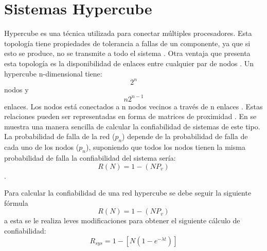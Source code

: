 \section{Sistemas Hypercube}\label{sec:hypercube}
Hypercube es una técnica utilizada para
conectar múltiples procesadores. Esta topología
tiene propiedades de tolerancia a fallas de un
componente, ya que si esto se produce, no se
transmite a todo el sistema \citep{Rong96}. Otra ventaja que
presenta esta topología es la disponibilidad de
enlaces entre cualquier par de nodos \citep{Mostafa14}. Un
hypercube n-dimensional tiene: $$2^n $$ nodos y $$n2^{n-1}$$ enlaces.
Los nodos está conectados a n nodos vecinos a través de n enlaces \citep{Rong96}. Estas
relaciones pueden ser representadas en forma de matrices de proximidad \citep{Mostafa14}.
En \cite{Mostafa14} se muestra una manera sencilla de calcular la confiabilidad
de sistemas de este tipo. La probabilidad de falla de la red ($p_n$) depende
de la probabilidad de falla de cada uno de los nodos ($p_n$), suponiendo
que todos los nodos tienen la misma probabilidad de falla la confiabilidad
del sistema sería: $$R(N) = 1 -(NP_v)$$.

Para calcular la confiabilidad de una red hypercube se debe seguir
la siguiente fórmula $$R(N) = 1 -(NP_v)$$ a esta se le realiza leves modificaciones
para obtener el siguiente cálculo de confiabilidad: $$ R_{sys} = 1 - [N(1-e^{- \lambda t})]$$
